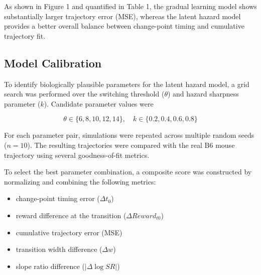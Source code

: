 \begin{table}[htbp]
\centering
\caption{Quantitative Model Fit (Real B6 vs models; $n = 10$ seeds)}
\label{tab:model_fit}
\end{table}
As shown in Figure 1 and quantified in Table 1, the gradual learning model shows substantially larger trajectory error (MSE), whereas the latent hazard model provides a better overall balance between change-point timing and cumulative trajectory fit.

\subsection{Model Calibration}

To identify biologically plausible parameters for the latent hazard model, 
a grid search was performed over the switching threshold ($\theta$) and 
hazard sharpness parameter ($k$). Candidate parameter values were

\begin{equation}
\theta \in \{6,8,10,12,14\}, \quad
k \in \{0.2,0.4,0.6,0.8\}
\end{equation}

For each parameter pair, simulations were repeated across multiple random 
seeds ($n = 10$). The resulting trajectories were compared with the real 
B6 mouse trajectory using several goodness-of-fit metrics.

To select the best parameter combination, a composite score was constructed 
by normalizing and combining the following metrics:

\begin{itemize}
\item change-point timing error ($\Delta t_0$)
\item reward difference at the transition ($\Delta Reward_{t0}$)
\item cumulative trajectory error (MSE)
\item transition width difference ($\Delta w$)
\item slope ratio difference ($|\Delta \log SR|$)
\end{itemize}

